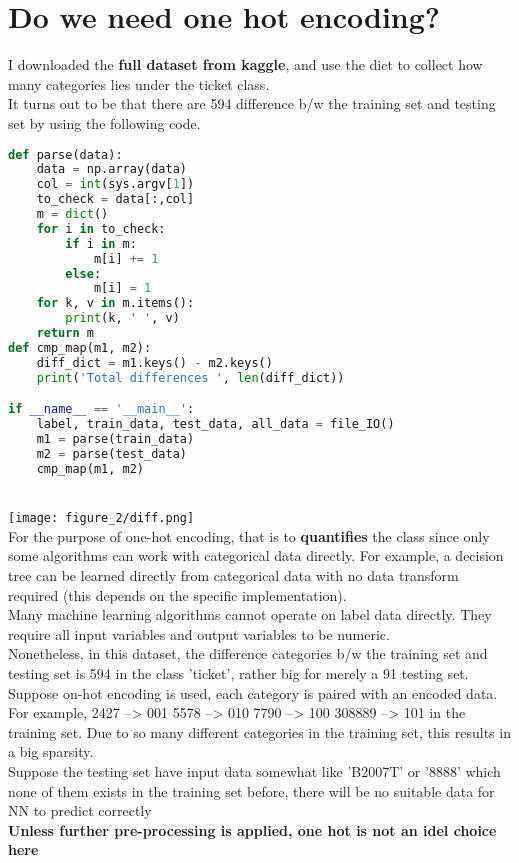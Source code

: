 \documentclass[11pt, a4paper]{article} %
\begin{document}
\section{Do we need one hot encoding?}
I downloaded the \textbf{full dataset from kaggle}, and use the dict to collect how many categories lies under the ticket class.
\\  It turns out to be that there are 594 difference b/w the training set and testing set by using the following code.
\begin{lstlisting}[language = python]
def parse(data):
    data = np.array(data)
    col = int(sys.argv[1])
    to_check = data[:,col]
    m = dict()
    for i in to_check:
        if i in m:
            m[i] += 1
        else:
            m[i] = 1
    for k, v in m.items():
        print(k, ' ', v)
    return m
def cmp_map(m1, m2):
    diff_dict = m1.keys() - m2.keys()
    print('Total differences ', len(diff_dict))

if __name__ == '__main__':
    label, train_data, test_data, all_data = file_IO()
    m1 = parse(train_data)
    m2 = parse(test_data)
    cmp_map(m1, m2)
\end{lstlisting}
\\ \texttt{[image: figure\_2/diff.png]}
\\ For the purpose of one-hot encoding, that is to \textbf{quantifies} the class since only some algorithms can work with categorical data directly. For example, a decision tree can be learned directly from categorical data with no data transform required (this depends on the specific implementation).
\\ Many machine learning algorithms cannot operate on label data directly. They require all input variables and output variables to be numeric.
\\ Nonetheless, in this dataset, the difference categories b/w the training set and testing set is 594 in the class 'ticket', rather big for merely a 91 testing set. Suppose on-hot encoding is used, each category is paired with an encoded data.
\\ For example, 2427 --> 001  5578 --> 010 7790 --> 100 308889 --> 101 in the training set. Due to so many different categories in the training set, this results in a big sparsity. 
\\ Suppose the testing set have input data somewhat like 'B2007T' or '8888' which none of them exists in the training set before, there will be no suitable data for NN to predict correctly
\\ \textbf{Unless further pre-processing is applied, one hot is not an idel choice here}
\end{document}
